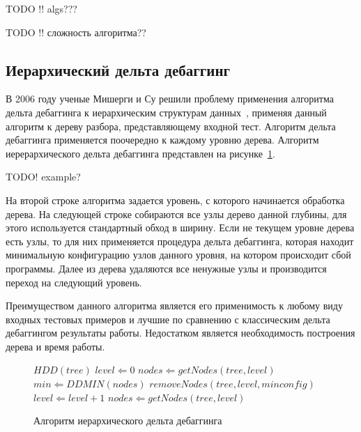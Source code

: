 TODO !! algs???

TODO !! сложность алгоритма??

\subsection{Иерархический дельта дебаггинг}
В 2006 году ученые Мишерги и Су решили проблему применения алгоритма дельта дебаггинга к иерархическим структурам данных~\cite{misherghi2006hdd}, применяя данный алгоритм к дереву разбора, представляющему входной тест. Алгоритм дельта дебаггинга применяется поочередно к каждому уровню дерева. Алгоритм иерерархического дельта дебаггинга представлен на рисунке~\ref{alg:hdd}. 

TODO! example?

На второй строке алгоритма задается уровень, с которого начинается обработка дерева. На следующей строке собираются все узлы дерево данной глубины, для этого используется стандартный обход в ширину. Если не текущем уровне дерева есть узлы, то для них применяется процедура дельта дебаггинга, которая находит минимальную конфигурацию узлов данного уровня, на котором происходит сбой программы. Далее из дерева удаляются все ненужные узлы и производится переход на следующий уровень. 

Преимуществом данного алгоритма является его применимость к любому виду входных тестовых примеров и лучшие по сравнению с классическим дельта дебаггингом результаты работы. Недостатком является необходимость построения дерева и время работы.
\begin{figure}[h]
\begin{algorithmic}[1]
\STATE $HDD(tree)$
\STATE $level \Leftarrow 0$
\STATE $nodes \Leftarrow getNodes(tree, level)$
	\STATE $min \Leftarrow DDMIN(nodes)$
	\STATE $removeNodes(tree, level, minconfig)$
	\STATE $level \Leftarrow level + 1$
	\STATE $nodes \Leftarrow getNodes(tree, level)$
\ENDWHILE
\end{algorithmic}
\caption{Алгоритм иерархического дельта дебаггинга}
\label{alg:hdd}
\end{figure}





